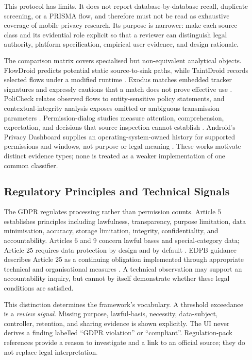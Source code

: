 This protocol has limits. It does not report database-by-database recall, duplicate screening, or a PRISMA flow, and therefore must not be read as exhaustive coverage of mobile privacy research. Its purpose is narrower: make each source class and its evidential role explicit so that a reviewer can distinguish legal authority, platform specification, empirical user evidence, and design rationale.

The comparison matrix covers specialised but non-equivalent analytical objects. FlowDroid predicts potential static source-to-sink paths, while TaintDroid records selected flows under a modified runtime \cite{flowdroid2014,taintdroid2010}. Exodus matches embedded tracker signatures and expressly cautions that a match does not prove effective use \cite{exodus2026}. PoliCheck relates observed flows to entity-sensitive policy statements, and contextual-integrity analysis exposes omitted or ambiguous transmission parameters \cite{policheck2020,shvartz2019}. Permission-dialog studies measure attention, comprehension, expectation, and decisions that source inspection cannot establish \cite{felt2012,bonne2017}. Android's Privacy Dashboard supplies an operating-system-owned history for supported permissions and windows, not purpose or legal meaning \cite{androiddashboard2026}. These works motivate distinct evidence types; none is treated as a weaker implementation of one common classifier.

\subsection{Regulatory Principles and Technical Signals}

The GDPR regulates processing rather than permission counts. Article 5 establishes principles including lawfulness, transparency, purpose limitation, data minimisation, accuracy, storage limitation, integrity, confidentiality, and accountability. Articles 6 and 9 concern lawful bases and special-category data; Article 25 requires data protection by design and by default \cite{eurlex2016}. EDPB guidance describes Article 25 as a continuing obligation implemented through appropriate technical and organisational measures \cite{edpb2019}. A technical observation may support an accountability inquiry, but cannot by itself demonstrate whether these legal conditions are satisfied.

This distinction determines the framework's vocabulary. A threshold exceedance is a \emph{review signal}. Missing purpose, lawful-basis, necessity, data-subject, controller, retention, and sharing evidence is shown explicitly. The UI never derives a finding labelled ``GDPR violation'' or ``compliant''. Regulation-pack references provide a reason to investigate and a link to an official source; they do not replace legal interpretation.

